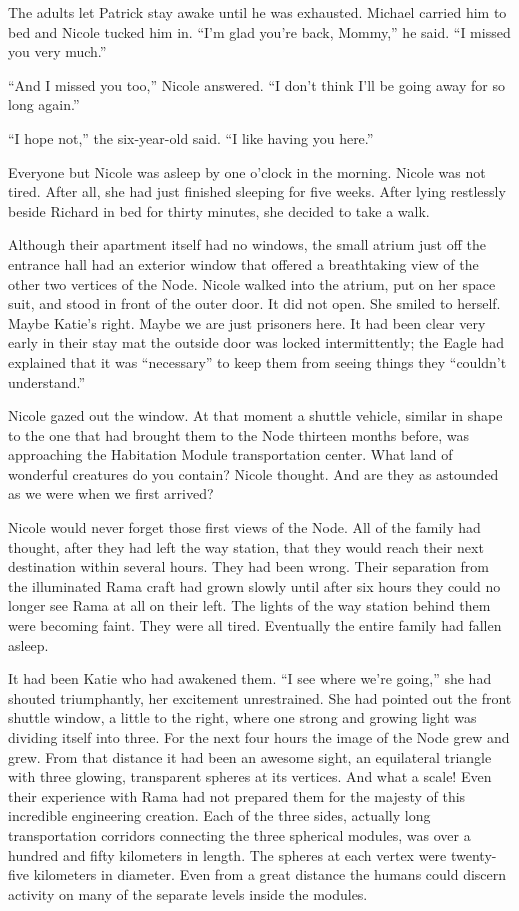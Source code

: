 \documentclass[]{article}
\begin{document}
{The adults let Patrick stay awake until he was exhausted.  Michael carried him to bed and Nicole tucked him in.  “I’m glad you’re back, Mommy,” he said.  “I missed you very much.”

“And I missed you too,” Nicole answered.  “I don’t think I’ll be going away for so long again.”

“I hope not,” the six-year-old said.  “I like having you here.”

Everyone but Nicole was asleep by one o’clock in the morning.  Nicole was not tired.  After all, she had just finished sleeping for five weeks.  After lying restlessly beside Richard in bed for thirty minutes, she decided to take a walk.

Although their apartment itself had no windows, the small atrium just off the entrance hall had an exterior window that offered a breathtaking view of the other two vertices of the Node.  Nicole walked into the atrium, put on her space suit, and stood in front of the outer door.  It did not open.  She smiled to herself.  Maybe Katie’s right.  Maybe we are just prisoners here.  It had been clear very early in their stay mat the outside door was locked intermittently; the Eagle had explained that it was “necessary” to keep them from seeing things they “couldn’t understand.”

Nicole gazed out the window.  At that moment a shuttle vehicle, similar in shape to the one that had brought them to the Node thirteen months before, was approaching the Habitation Module transportation center.  What land of wonderful creatures do you contain? Nicole thought.  And are they as astounded as we were when we first arrived?

Nicole would never forget those first views of the Node.  All of the family had thought, after they had left the way station, that they would reach their next destination within several hours.  They had been wrong.  Their separation from the illuminated Rama craft had grown slowly until after six hours they could no longer see Rama at all on their left.  The lights of the way station behind them were becoming faint.  They were all tired.  Eventually the entire family had fallen asleep.

It had been Katie who had awakened them.  “I see where we’re going,” she had shouted triumphantly, her excitement unrestrained.  She had pointed out the front shuttle window, a little to the right, where one strong and growing light was dividing itself into three.  For the next four hours the image of the Node grew and grew.  From that distance it had been an awesome sight, an equilateral triangle with three glowing, transparent spheres at its vertices.  And what a scale! Even their experience with Rama had not prepared them for the majesty of this incredible engineering creation.  Each of the three sides, actually long transportation corridors connecting the three spherical modules, was over a hundred and fifty kilometers in length.  The spheres at each vertex were twenty-five kilometers in diameter.  Even from a great distance the humans could discern activity on many of the separate levels inside the modules.

}
\end{document}
